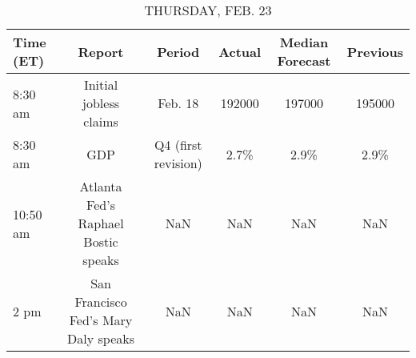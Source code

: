 \documentclass{article}%
\begin{document}
%


\begin{table}[htbp]%
\caption{THURSDAY, FEB. 23}%
\centering%
\begin{adjustbox}{width=1\textwidth}%
\begin{tabular}{lccccc}
\toprule
Time (ET) &                               Report &              Period & Actual & Median Forecast & Previous \\
\midrule
  8:30 am &               Initial jobless claims &             Feb. 18 & 192000 &          197000 &   195000 \\
  8:30 am &                                  GDP & Q4 (first revision) &   2.7\% &            2.9\% &     2.9\% \\
 10:50 am &  Atlanta Fed's Raphael Bostic speaks &                 NaN &    NaN &             NaN &      NaN \\
     2 pm & San Francisco Fed's Mary Daly speaks &                 NaN &    NaN &             NaN &      NaN \\
\bottomrule
\end{tabular}
%
\end{adjustbox}%
\end{table}

%
\end{document}
